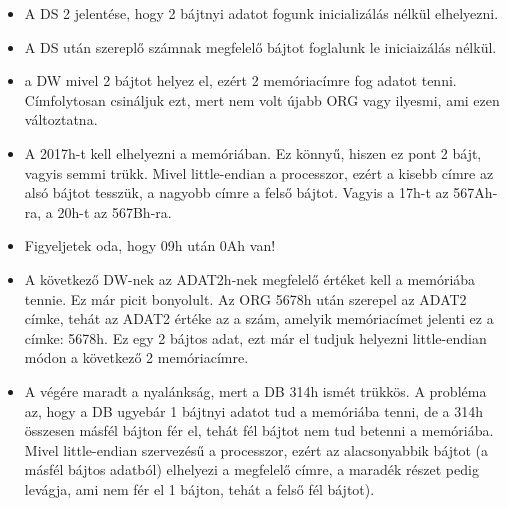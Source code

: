 \documentclass{article}
\begin{document}
\begin{itemize}
	\item A DS 2 jelentése, hogy 2 bájtnyi adatot fogunk inicializálás nélkül elhelyezni.
	\item \colorbox{orange!30}{A DS után szereplő számnak megfelelő bájtot foglalunk le iniciaizálás nélkül.}
	\item a DW mivel 2 bájtot helyez el, ezért 2 memóriacímre fog adatot tenni. Címfolytosan csináljuk ezt, mert nem volt újabb ORG vagy ilyesmi, ami ezen változtatna.
	\item A 2017h-t kell elhelyezni a memóriában. Ez könnyű, hiszen ez pont 2 bájt, vagyis semmi trükk. Mivel little-endian a processzor, ezért a kisebb címre az alsó bájtot tesszük, a nagyobb címre a felső bájtot. Vagyis a 17h-t az 567Ah-ra, a 20h-t az 567Bh-ra.
	\item \colorbox{orange!30}{Figyeljetek oda, hogy 09h után 0Ah van!}
	\item A következő DW-nek az ADAT2h-nek megfelelő értéket kell a memóriába tennie. Ez már picit bonyolult. Az ORG 5678h után szerepel az ADAT2 címke, tehát az ADAT2 értéke az a szám, amelyik memóriacímet jelenti ez a címke: 5678h. Ez egy 2 bájtos adat, ezt már el tudjuk helyezni little-endian módon a következő 2 memóriacímre.
	\item A végére maradt a nyalánkság, mert a DB 314h ismét trükkös. A probléma az, hogy a DB ugyebár 1 bájtnyi adatot tud a memóriába tenni, de a 314h összesen másfél bájton fér el, tehát fél bájtot nem tud betenni a memóriába. Mivel little-endian szervezésű a processzor, ezért az alacsonyabbik bájtot (a másfél bájtos adatból) elhelyezi a megfelelő címre, a maradék részet pedig levágja, ami nem fér el 1 bájton, tehát a felső fél bájtot).
\end{itemize}
\end{document}
